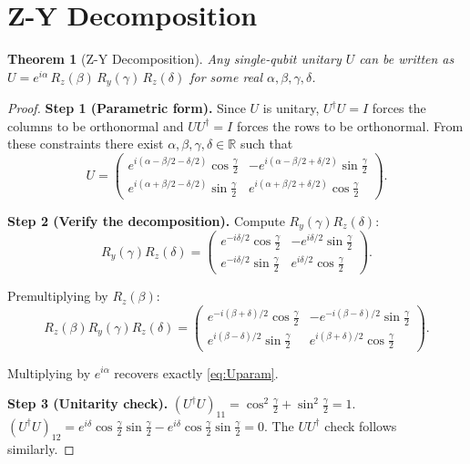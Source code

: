 \documentclass[12pt, a4paper, oneside]{report}
\theoremstyle{plain}
\newtheorem{theorem}{Theorem}[chapter]
\theoremstyle{definition}
\theoremstyle{remark}
\newcommand{\RR}{\mathbb{R}}
\newcommand{\Ry}{R_y}
\newcommand{\Rz}{R_z}
\begin{document}
\section{Z-Y Decomposition}

\begin{theorem}[Z-Y Decomposition]
\label{thm:zy}
Any single-qubit unitary $U$ can be written as
$U = e^{i\alpha}\,\Rz(\beta)\,\Ry(\gamma)\,\Rz(\delta)$
for some real $\alpha, \beta, \gamma, \delta$.
\end{theorem}

\begin{proof}
\textbf{Step 1 (Parametric form).}
Since $U$ is unitary, $U^\dagger U = I$ forces the columns to be orthonormal and
$UU^\dagger = I$ forces the rows to be orthonormal. From these constraints there exist
$\alpha, \beta, \gamma, \delta \in \RR$ such that
\begin{equation}\label{eq:Uparam}
  U = \begin{pmatrix}
    e^{i(\alpha - \beta/2 - \delta/2)}\cos\frac{\gamma}{2} &
    -e^{i(\alpha - \beta/2 + \delta/2)}\sin\frac{\gamma}{2} \\[4pt]
    e^{i(\alpha + \beta/2 - \delta/2)}\sin\frac{\gamma}{2} &
     e^{i(\alpha + \beta/2 + \delta/2)}\cos\frac{\gamma}{2}
  \end{pmatrix}.
\end{equation}

\textbf{Step 2 (Verify the decomposition).}
Compute $\Ry(\gamma)\Rz(\delta)$:
\[
  \Ry(\gamma)\Rz(\delta)
  = \begin{pmatrix}
      e^{-i\delta/2}\cos\frac{\gamma}{2} & -e^{i\delta/2}\sin\frac{\gamma}{2}\\
      e^{-i\delta/2}\sin\frac{\gamma}{2} &  e^{i\delta/2}\cos\frac{\gamma}{2}
    \end{pmatrix}.
\]

Premultiplying by $\Rz(\beta)$:
\[
  \Rz(\beta)\Ry(\gamma)\Rz(\delta)
  = \begin{pmatrix}
      e^{-i(\beta+\delta)/2}\cos\frac{\gamma}{2} & -e^{-i(\beta-\delta)/2}\sin\frac{\gamma}{2}\\
      e^{i(\beta-\delta)/2}\sin\frac{\gamma}{2}  &  e^{i(\beta+\delta)/2}\cos\frac{\gamma}{2}
    \end{pmatrix}.
\]

Multiplying by $e^{i\alpha}$ recovers exactly \cref{eq:Uparam}.

\textbf{Step 3 (Unitarity check).}
$(U^\dagger U)_{11} = \cos^2\!\frac{\gamma}{2}+\sin^2\!\frac{\gamma}{2} = 1$.
$(U^\dagger U)_{12} = e^{i\delta}\cos\frac{\gamma}{2}\sin\frac{\gamma}{2}
                      - e^{i\delta}\cos\frac{\gamma}{2}\sin\frac{\gamma}{2} = 0$.
The $UU^\dagger$ check follows similarly.
\end{proof}
\end{document}
